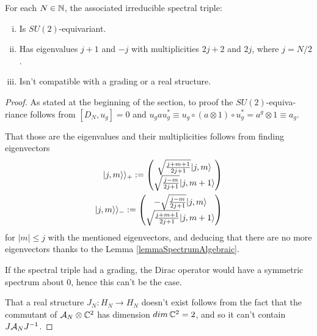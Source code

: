 \begin{proposition}\label{propIrredSpectralTriple}
For each $N \in \mathbb{N}$, the associated irreducible spectral triple:
    \begin{enumerate}[(i)]
        
    \item Is $SU(2)$-equivariant.
    
    \item Has eigenvalues $j+1$ and $-j$ with multiplicities $2j+2$ and $2j$, where $j = N/2$.
        
    \item Isn't compatible with a grading or a real structure.
    \end{enumerate}
\end{proposition}

\begin{proof}
As stated at the beginning of the section, to proof the $SU(2)$-equiva- riance follows from $[D_N, u_g] = 0$ and $u_g  a  u_g^* \equiv u_g \circ (a \otimes 1) \circ u_g^* = a^g \otimes 1 \equiv a_g$.

That those are the eigenvalues and their multiplicities follows from finding eigenvectors 
\begin{align}\label{irreducibleDiracFuzzySpinorBasis}
    |j, m \rangle\rangle_+ := 
    \begin{pmatrix} 
    \sqrt{\frac{j+m+1}{2j+1}} |j, m\rangle \\ 
    \sqrt{\frac{j-m}{2j+1}} |j, m+1 \rangle
    \end{pmatrix} \\
    |j, m\rangle\rangle_- := 
    \begin{pmatrix} 
    -\sqrt{\frac{j-m}{2j+1}} |j, m\rangle \\ 
    \sqrt{\frac{j+m+1}{2j+1}} |j, m+1 \rangle
    \end{pmatrix}
\end{align}
for $|m| \leq j$ with the mentioned eigenvectors, and deducing that there are no more eigenvectors thanks to the Lemma \ref{lemmaSpectrumAlgebraic}.

If the spectral triple had a grading, the Dirac operator would have a symmetric spectrum about $0$, hence this can't be the case.

That a real structure $J_N: H_N \to H_N$ doesn't exist follows from the fact that the commutant of $\mathcal A_N\otimes \mathbb{C}^2$ has dimension $dim\, \mathbb{C}^2 = 2$, and so it can't contain $J \mathcal A_N J^{-1}$.

\end{proof}


